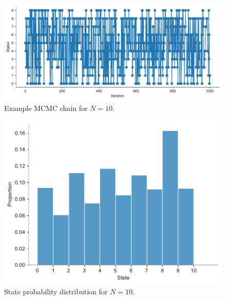 \begin{figure}[H]
    \centering
    \includegraphics[width=0.8\linewidth]{data/05_reporting/problem_set_2/walk_plot.pdf}
    \caption{Example MCMC chain for $N=10$.}
    \label{fig:walk-plot}
\end{figure}

\begin{figure}[H]
    \centering
    \includegraphics[width=\linewidth]{data/05_reporting/problem_set_2/state_probability.pdf}
    \caption{State probability distribution for $N=10$.}
    \label{fig:enter-label}
\end{figure}

